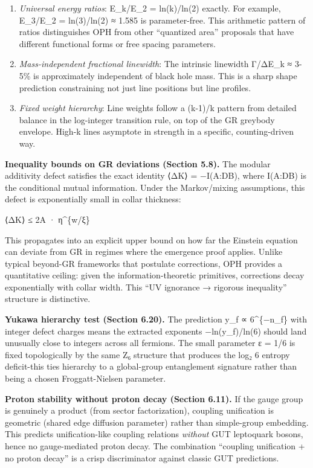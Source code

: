 \documentclass[
]{article}
\begin{document}
\begin{enumerate}
\def\labelenumi{\arabic{enumi}.}
\item
  \emph{Universal energy ratios}: E\_k/E\_2 = ln(k)/ln(2) exactly. For
  example, E\_3/E\_2 = ln(3)/ln(2) ≈ 1.585 is parameter-free. This
  arithmetic pattern of ratios distinguishes OPH from other ``quantized
  area'' proposals that have different functional forms or free spacing
  parameters.
\item
  \emph{Mass-independent fractional linewidth}: The intrinsic linewidth
  Γ/ΔE\_k ≈ 3-5\% is approximately independent of black hole mass. This
  is a sharp shape prediction constraining not just line positions but
  line profiles.
\item
  \emph{Fixed weight hierarchy}: Line weights follow a (k-1)/k pattern
  from detailed balance in the log-integer transition rule, on top of
  the GR greybody envelope. High-k lines asymptote in strength in a
  specific, counting-driven way.
\end{enumerate}

\textbf{Inequality bounds on GR deviations (Section 5.8).} The modular
additivity defect satisfies the exact identity ⟨ΔK⟩ = −I(A:D\textbar B),
where I(A:D\textbar B) is the conditional mutual information. Under the
Markov/mixing assumptions, this defect is exponentially small in collar
thickness:

\textbar⟨ΔK⟩\textbar{} ≤ 2\textbar A\textbar{} · η\^{}\{w/ξ\}

This propagates into an explicit upper bound on how far the Einstein
equation can deviate from GR in regimes where the emergence proof
applies. Unlike typical beyond-GR frameworks that postulate corrections,
OPH provides a quantitative ceiling: given the information-theoretic
primitives, corrections decay exponentially with collar width. This ``UV
ignorance → rigorous inequality'' structure is distinctive.

\textbf{Yukawa hierarchy test (Section 6.20).} The prediction y\_f ∝
6\^{}\{−n\_f\} with integer defect charges means the extracted exponents
−ln(y\_f)/ln(6) should land unusually close to integers across all
fermions. The small parameter ε = 1/6 is fixed topologically by the same
Z₆ structure that produces the log₂ 6 entropy deficit-this ties
hierarchy to a global-group entanglement signature rather than being a
chosen Froggatt-Nielsen parameter.

\textbf{Proton stability without proton decay (Section 6.11).} If the
gauge group is genuinely a product (from sector factorization), coupling
unification is geometric (shared edge diffusion parameter) rather than
simple-group embedding. This predicts unification-like coupling
relations \emph{without} GUT leptoquark bosons, hence no gauge-mediated
proton decay. The combination ``coupling unification + no proton decay''
is a crisp discriminator against classic GUT predictions.
\end{document}
